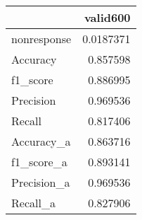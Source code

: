 
\begin{tabular}{lr}
\hline
             &     valid600 \\
\hline
 nonresponse & 0.0187371 \\
 Accuracy    & 0.857598  \\
 f1_score    & 0.886995  \\
 Precision   & 0.969536  \\
 Recall      & 0.817406  \\
 Accuracy_a  & 0.863716  \\
 f1_score_a  & 0.893141  \\
 Precision_a & 0.969536  \\
 Recall_a    & 0.827906  \\
\hline
\end{tabular}
